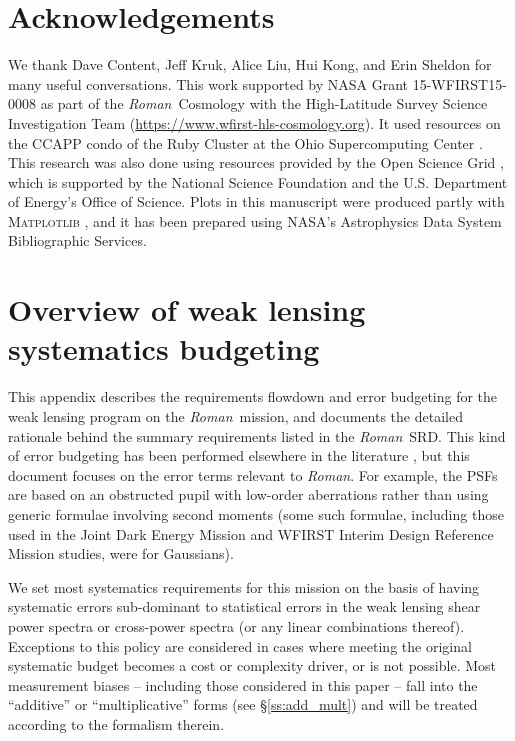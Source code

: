 \documentclass[usenatbib]{mnras}
\newcommand{\wfirst}{{\slshape Roman}}
\begin{document}
\section*{Acknowledgements}

 We thank Dave Content, Jeff Kruk, Alice Liu, Hui Kong, and Erin Sheldon for many useful conversations. 
This work supported by NASA Grant 15-WFIRST15-0008 as part of the \wfirst\ Cosmology with the High-Latitude Survey Science Investigation Team (\url{https://www.wfirst-hls-cosmology.org}). 
It used resources on the CCAPP condo of the Ruby Cluster at the Ohio Supercomputing Center \citep{OhioSupercomputerCenter1987}. This research was also done using resources provided by the Open Science Grid \citep{Pordes2008,Sfiligoi2009}, which is supported by the National Science Foundation and the U.S. Department of Energy's Office of Science. Plots in this manuscript were produced partly with \textsc{Matplotlib} \citep{Hunter:2007}, and it has been prepared using NASA's Astrophysics Data System Bibliographic Services.




\appendix

\section{Overview of weak lensing systematics budgeting}
\label{app:wl-budget}

This appendix describes the requirements flowdown and error budgeting
for the weak lensing program on the \wfirst\ mission, and documents the
detailed rationale behind the summary requirements listed in the
\wfirst\ SRD. This kind of error budgeting has been performed elsewhere
in the literature \citep{2008A&A...484...67P,2013MNRAS.429..661M}, but
this document focuses on the error terms relevant to \wfirst. For
example, the PSFs are based on an obstructed pupil with low-order
aberrations rather than using generic formulae involving second
moments (some such formulae, including those used in the Joint Dark Energy Mission and
WFIRST Interim Design Reference Mission studies, were for Gaussians).

We set most systematics requirements for this mission on the basis of
having systematic errors sub-dominant to statistical errors in the weak lensing
shear power spectra or cross-power spectra (or any linear combinations
thereof). Exceptions to this policy are considered in cases
where meeting the original systematic budget becomes a cost or
complexity driver, or is not possible. Most measurement biases -- including those considered in this paper -- fall
into the ``additive'' or ``multiplicative'' forms (see
\S\ref{ss:add_mult}) and will be treated according to the formalism
therein.
\end{document}
